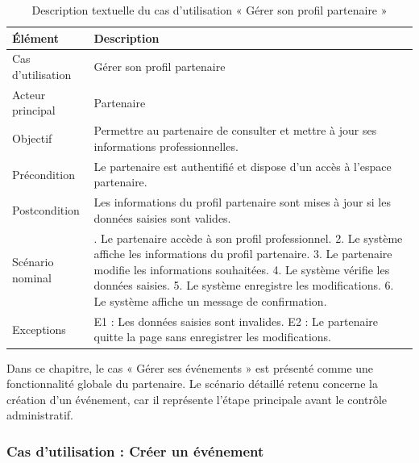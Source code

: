 \begin{table}[H]
\centering
\caption{Description textuelle du cas d’utilisation « Gérer son profil partenaire »}
\label{tableau:4-4}
\renewcommand{\arraystretch}{1.2}
\begin{tabularx}{\textwidth}{|>{\raggedright\arraybackslash}X|>{\raggedright\arraybackslash}X|}
\hline
\rowcolor[HTML]{ECF4FF}
\textbf{Élément} & \textbf{Description} \\
\hline
Cas d’utilisation & Gérer son profil partenaire \\
\hline
Acteur principal & Partenaire \\
\hline
Objectif & Permettre au partenaire de consulter et mettre à jour ses informations professionnelles. \\
\hline
Précondition & Le partenaire est authentifié et dispose d’un accès à l’espace partenaire. \\
\hline
Postcondition & Les informations du profil partenaire sont mises à jour si les données saisies sont valides. \\
\hline
Scénario nominal & 1. Le partenaire accède à son profil professionnel.\newline{} 2. Le système affiche les informations du profil partenaire.\newline{} 3. Le partenaire modifie les informations souhaitées.\newline{} 4. Le système vérifie les données saisies.\newline{} 5. Le système enregistre les modifications.\newline{} 6. Le système affiche un message de confirmation. \\
\hline
Exceptions & E1 : Les données saisies sont invalides.\newline{} E2 : Le partenaire quitte la page sans enregistrer les modifications. \\
\hline
\end{tabularx}
\end{table}


Dans ce chapitre, le cas « Gérer ses événements » est présenté comme une fonctionnalité globale du partenaire. Le scénario détaillé retenu concerne la création d’un événement, car il représente l’étape principale avant le contrôle administratif.


\subsubsection{Cas d’utilisation : Créer un événement}


